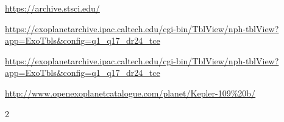 \documentclass[twoside]{article}
\begin{document}
\begin{multicols}{2}
\begin{thebibliography}{99}
\url{https://archive.stsci.edu/}

\url{https://exoplanetarchive.ipac.caltech.edu/cgi-bin/TblView/nph-tblView?app=ExoTbls&config=q1_q17_dr24_tce}

\url{https://exoplanetarchive.ipac.caltech.edu/cgi-bin/TblView/nph-tblView?app=ExoTbls&config=q1_q17_dr24_tce}
 
\url{http://www.openexoplanetcatalogue.com/planet/Kepler-109%20b/} 
\end{thebibliography}


\end{multicols}{2}
\end{document}
